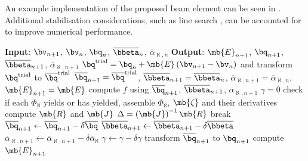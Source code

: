 An example implementation of the proposed beam element can be seen in . Additional stabilisation considerations, such as line search \cite{Dutko1993}, can be accounted for to improve numerical performance.
\begin{breakablealgorithm}
\caption{state determination of the proposed beam element}\label{algo:beam_model}
\begin{algorithmic}
\State \textbf{Input}: $\bv_{n+1}$, $\bv_n$, $\bq_n$, $\overline{\bbeta}_n$, $\overline{\alpha}_{\aleph,n}$
\State \textbf{Output}: $\mb{E}_{n+1}$, $\bq_{n+1}$, $\overline{\bbeta}_{n+1}$, $\overline{\alpha}_{\aleph,n+1}$
\State $\bq^\text{trial}=\bq_n+\mb{E}\left(\bv_{n+1}-\bv_n\right)$ and transform $\bq^\text{trial}$ to $\overline{\bq}^\text{trial}$
\State $\overline{\bq}_{n+1}=\overline{\bq}^\text{trial}$, $\overline{\bbeta}_{n+1}=\overline{\bbeta}_n$, $\overline{\alpha}_{\aleph,n+1}=\overline{\alpha}_{\aleph,n}$, $\mb{E}_{n+1}=\mb{E}$
\State compute $f$ using $\overline{\bq}_{n+1}$, $\overline{\bbeta}_{n+1}$, $\overline{\alpha}_{\aleph,n+1}$
\State $\gamma=0$
\State check if each $\Phi_\aleph$ yields or has yielded, assemble $\Phi_\aleph$, $\mb{\zeta}$ and their derivatives
\State compute $\mb{R}$ and $\mb{J}$
\State $\Delta=\left(\mb{J}\right)^{-1}\mb{R}$
\State break
\EndIf
\State $\overline{\bq}_{n+1}\leftarrow\overline{\bq}_{n+1}-\delta\overline{\bq}$
\State $\overline{\bbeta}_{n+1}\leftarrow\overline{\bbeta}_{n+1}-\delta\overline{\bbeta}$
\State $\overline{\alpha}_{\aleph,n+1}\leftarrow\overline{\alpha}_{\aleph,n+1}-\delta\overline{\alpha}_{\aleph}$
\State $\gamma\leftarrow\gamma-\delta\gamma$
\EndWhile
\State transform $\overline{\bq}_{n+1}$ to $\bq_{n+1}$
\State compute $\mb{E}_{n+1}$
\EndIf
\end{algorithmic}
\end{breakablealgorithm}